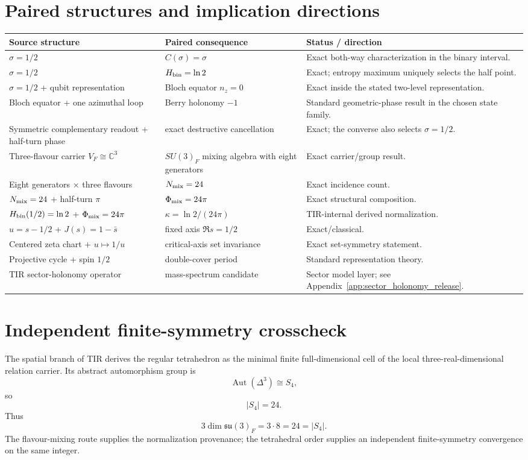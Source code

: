 \section{Paired structures and implication directions}
\begin{longtable}{p{}p{}p{}}
\toprule
Source structure & Paired consequence & Status / direction \\
\midrule
$\sigma=1/2$ & $C(\sigma)=\sigma$ & Exact both-way characterization in the binary interval.\\
$\sigma=1/2$ & $H_{\rm bin}=\ln2$ & Exact; entropy maximum uniquely selects the half point.\\
$\sigma=1/2$ + qubit representation & Bloch equator $n_z=0$ & Exact inside the stated two-level representation.\\
Bloch equator + one azimuthal loop & Berry holonomy $-1$ & Standard geometric-phase result in the chosen state family.\\
Symmetric complementary readout + half-turn phase & exact destructive cancellation & Exact; the converse also selects $\sigma=1/2$.\\
Three-flavour carrier $V_F\cong\mathbb C^3$ & $SU(3)_F$ mixing algebra with eight generators & Exact carrier/group result.\\
Eight generators $\times$ three flavours & $N_{\rm mix}=24$ & Exact incidence count.\\
$N_{\rm mix}=24$ + half-turn $\pi$ & $\Phi_{\rm mix}=24\pi$ & Exact structural composition.\\
$H_{\rm bin}(1/2)=\ln2$ + $\Phi_{\rm mix}=24\pi$ & $\kappa=\ln2/(24\pi)$ & TIR-internal derived normalization.\\
$u=s-1/2$ + $J(s)=1-\bar s$ & fixed axis $\Re s=1/2$ & Exact/classical.\\
Centered zeta chart + $u\mapsto1/u$ & critical-axis set invariance & Exact set-symmetry statement.\\
Projective cycle + spin $1/2$ & double-cover period & Standard representation theory.\\
TIR sector-holonomy operator & mass-spectrum candidate & Sector model layer; see Appendix~\ref{app:sector_holonomy_release}.\\
\bottomrule
\end{longtable}

\section{Independent finite-symmetry crosscheck}
The spatial branch of TIR derives the regular tetrahedron as the minimal finite full-dimensional cell of the local three-real-dimensional relation carrier. Its abstract automorphism group is
\[
\operatorname{Aut}(\Delta^3)\cong S_4,
\]
so
\[
|S_4|=24.
\]
Thus
\[
\boxed{
3\dim\mathfrak{su}(3)_F
=3\cdot8
=24
=|S_4|.
}
\]
The flavour-mixing route supplies the normalization provenance; the tetrahedral order supplies an independent finite-symmetry convergence on the same integer.

